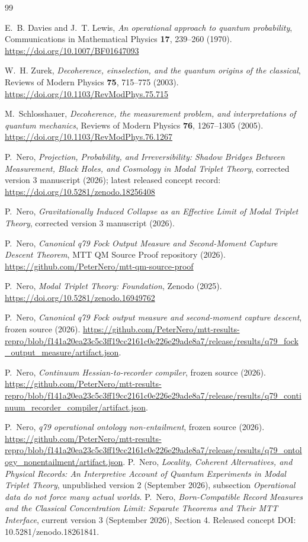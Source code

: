 \documentclass[11pt]{article}
\begin{document}
\begin{thebibliography}{99}
\raggedright

E.~B. Davies and J.~T. Lewis,
\emph{An operational approach to quantum probability},
Communications in Mathematical Physics \textbf{17}, 239--260 (1970).
\url{https://doi.org/10.1007/BF01647093}

W.~H. Zurek,
\emph{Decoherence, einselection, and the quantum origins of the classical},
Reviews of Modern Physics \textbf{75}, 715--775 (2003).
\url{https://doi.org/10.1103/RevModPhys.75.715}

M.~Schlosshauer,
\emph{Decoherence, the measurement problem, and interpretations of quantum
mechanics},
Reviews of Modern Physics \textbf{76}, 1267--1305 (2005).
\url{https://doi.org/10.1103/RevModPhys.76.1267}

P.~Nero,
\emph{Projection, Probability, and Irreversibility: Shadow Bridges Between
Measurement, Black Holes, and Cosmology in Modal Triplet Theory},
corrected version 3 manuscript (2026); latest released concept record:
\url{https://doi.org/10.5281/zenodo.18256408}

P.~Nero,
\emph{Gravitationally Induced Collapse as an Effective Limit of Modal Triplet
Theory},
corrected version 3 manuscript (2026).

P.~Nero,
\emph{Canonical q79 Fock Output Measure and Second-Moment Capture Descent
Theorem},
MTT QM Source Proof repository (2026).
\url{https://github.com/PeterNero/mtt-qm-source-proof}

P.~Nero,
\emph{Modal Triplet Theory: Foundation},
Zenodo (2025).
\url{https://doi.org/10.5281/zenodo.16949762}

P.~Nero, \emph{Canonical q79 Fock output measure and second-moment capture descent}, frozen source (2026).
\url{https://github.com/PeterNero/mtt-results-repro/blob/f141a20ea23c5c3ff19cc2161c0e226e29ade8a7/release/results/q79_fock_output_measure/artifact.json}.

P.~Nero, \emph{Continuum Hessian-to-recorder compiler}, frozen source (2026).
\url{https://github.com/PeterNero/mtt-results-repro/blob/f141a20ea23c5c3ff19cc2161c0e226e29ade8a7/release/results/q79_continuum_recorder_compiler/artifact.json}.

P.~Nero, \emph{q79 operational ontology non-entailment}, frozen source (2026).
\url{https://github.com/PeterNero/mtt-results-repro/blob/f141a20ea23c5c3ff19cc2161c0e226e29ade8a7/release/results/q79_ontology_nonentailment/artifact.json}.
P.~Nero, \emph{Locality, Coherent Alternatives, and Physical Records:
An Interpretive Account of Quantum Experiments in Modal Triplet Theory},
unpublished version 2 (September 2026), subsection \emph{Operational data do not
force many actual worlds}.
P.~Nero, \emph{Born-Compatible Record Measures and the Classical Concentration
Limit: Separate Theorems and Their MTT Interface}, current version 3
(September 2026), Section 4. Released concept DOI: 10.5281/zenodo.18261841.

\end{thebibliography}
\end{document}
